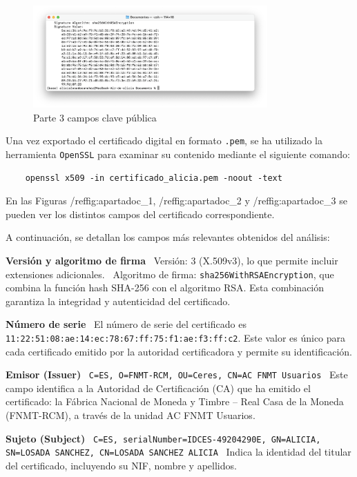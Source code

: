 \begin{figure}[H]   
    \centering
    \includegraphics[width=0.8\textwidth]{apartadoc_3.png}
    \caption{Parte 3 campos clave pública}
    \label{fig:apartadoc_3}
\end{figure}

Una vez exportado el certificado digital en formato \texttt{.pem}, se ha utilizado la herramienta \texttt{OpenSSL} para examinar su contenido mediante el siguiente comando: 


\begin{verbatim}
    openssl x509 -in certificado_alicia.pem -noout -text 
\end{verbatim}



En las Figuras /ref{fig:apartadoc_1}, /ref{fig:apartadoc_2} y /ref{fig:apartadoc_3} se pueden ver los distintos campos del certificado correspondiente.  

A continuación, se detallan los campos más relevantes obtenidos del análisis: 

\textbf{Versión y algoritmo de firma} \ Versión: 3 (X.509v3), lo que permite incluir extensiones adicionales. \ Algoritmo de firma: \texttt{sha256WithRSAEncryption}, que combina la función hash SHA-256 con el algoritmo RSA. Esta combinación garantiza la integridad y autenticidad del certificado. 

\textbf{Número de serie} \ El número de serie del certificado es \texttt{11:22:51:08:ae:14:ec:78:67:ff:75:f1:ae:f3:ff:c2}. Este valor es único para cada certificado emitido por la autoridad certificadora y permite su identificación. 

\textbf{Emisor (Issuer)} \ \texttt{C=ES, O=FNMT-RCM, OU=Ceres, CN=AC FNMT Usuarios} \ Este campo identifica a la Autoridad de Certificación (CA) que ha emitido el certificado: la Fábrica Nacional de Moneda y Timbre – Real Casa de la Moneda (FNMT-RCM), a través de la unidad AC FNMT Usuarios. 

\textbf{Sujeto (Subject)} \ \texttt{C=ES, serialNumber=IDCES-49204290E, GN=ALICIA, SN=LOSADA SANCHEZ, CN=LOSADA SANCHEZ ALICIA} \ Indica la identidad del titular del certificado, incluyendo su NIF, nombre y apellidos. 

